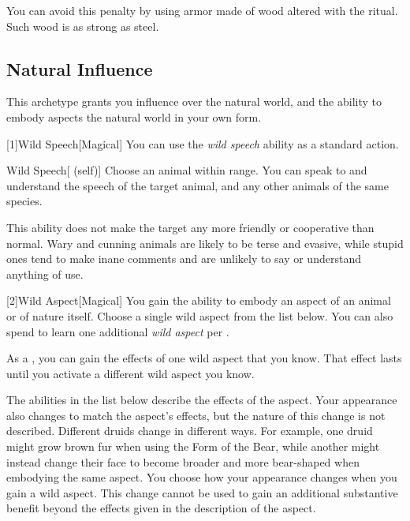         You can avoid this penalty by using armor made of wood altered with the  ritual.
        Such wood is as strong as steel.

    \subsection{Natural Influence}\label{Natural Influence}
        This archetype grants you influence over the natural world, and the ability to embody aspects the natural world in your own form.

        [1]{Wild Speech}[Magical] You can use the \textit{wild speech} ability as a standard action.
        \begin{attuneability}{Wild Speech}[ (self)]
            Choose an animal within \rnglong range.
            You can speak to and understand the speech of the target animal, and any other animals of the same species.

            This ability does not make the target any more friendly or cooperative than normal.
            Wary and cunning animals are likely to be terse and evasive, while stupid ones tend to make inane comments and are unlikely to say or understand anything of use.
        \end{attuneability}

        [2]{Wild Aspect}[Magical]
        You gain the ability to embody an aspect of an animal or of nature itself.
        Choose a single wild aspect from the list below.
        You can also spend  to learn one additional \textit{wild aspect} per .

        As a , you can gain the effects of one wild aspect that you know.
        That effect lasts until you activate a different wild aspect you know.

        The abilities in the list below describe the effects of the aspect.
        Your appearance also changes to match the aspect's effects, but the nature of this change is not described.
        Different druids change in different ways.
        For example, one druid might grow brown fur when using the Form of the Bear, while another might instead change their face to become broader and more bear-shaped when embodying the same aspect.
        You choose how your appearance changes when you gain a wild aspect.
        This change cannot be used to gain an additional substantive benefit beyond the effects given in the description of the aspect.

